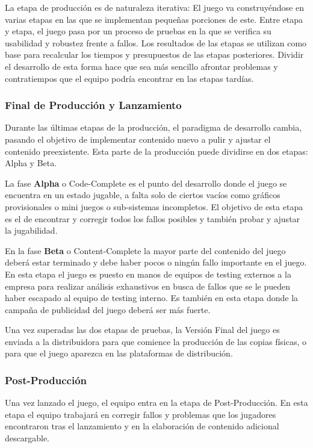 La etapa de producción es de naturaleza iterativa: El juego va construyéndose en varias etapas en las que se implementan pequeñas porciones de este. Entre etapa y etapa, el juego pasa por un proceso de pruebas en la que se verifica su usabilidad y robustez frente a fallos. Los resultados de las etapas se utilizan como base para recalcular los tiempos y presupuestos de las etapas posteriores. Dividir el desarrollo de esta forma hace que sea más sencillo afrontar problemas y contratiempos que el equipo podría encontrar en las etapas tardías.

\subsubsection{Final de Producción y Lanzamiento}
Durante las últimas etapas de la producción, el paradigma de desarrollo cambia, pasando el objetivo de implementar contenido nuevo a pulir y ajustar el contenido preexistente. Esta parte de la producción puede dividirse en dos etapas: Alpha y Beta.

La fase \textbf{Alpha} o Code-Complete es el punto del desarrollo donde el juego se encuentra en un estado jugable, a falta solo de ciertos vacíos como gráficos provisionales o mini juegos o sub-sistemas incompletos. El objetivo de esta etapa es el de encontrar y corregir todos los fallos posibles y también probar y ajustar la jugabilidad\cite{development_and_production}.

En la fase \textbf{Beta} o Content-Complete la mayor parte del contenido del juego deberá estar terminado y debe haber pocos o ningún fallo importante en el juego. En esta etapa el juego es puesto en manos de equipos de testing externos a la empresa para realizar análisis exhaustivos en busca de fallos que se le pueden haber escapado al equipo de testing interno. Es también en esta etapa donde la campaña de publicidad del juego deberá ser más fuerte\cite{development_and_production}.

Una vez superadas las dos etapas de pruebas, la Versión Final del juego es enviada a la distribuidora para que comience la producción de las copias físicas, o para que el juego aparezca en las plataformas de distribución.

\subsubsection{Post-Producción}
Una vez lanzado el juego, el equipo entra en la etapa de Post-Producción. En esta etapa el equipo trabajará en corregir fallos y problemas que los jugadores encontraron tras el lanzamiento y en la elaboración de contenido adicional descargable.

